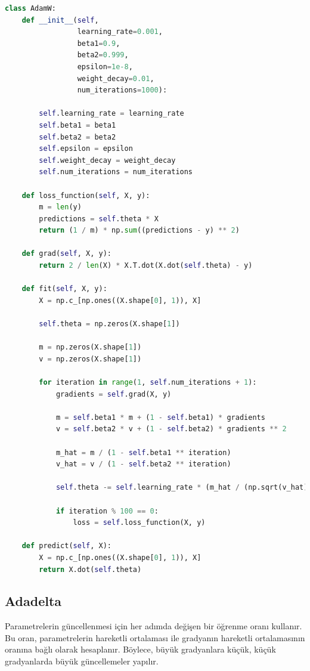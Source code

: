 \begin{lstlisting}[language=Python]
class AdamW:
    def __init__(self,
                 learning_rate=0.001,
                 beta1=0.9,
                 beta2=0.999,
                 epsilon=1e-8,
                 weight_decay=0.01,
                 num_iterations=1000):

        self.learning_rate = learning_rate
        self.beta1 = beta1
        self.beta2 = beta2
        self.epsilon = epsilon
        self.weight_decay = weight_decay
        self.num_iterations = num_iterations

    def loss_function(self, X, y):
        m = len(y)
        predictions = self.theta * X
        return (1 / m) * np.sum((predictions - y) ** 2)

    def grad(self, X, y):
        return 2 / len(X) * X.T.dot(X.dot(self.theta) - y)

    def fit(self, X, y):
        X = np.c_[np.ones((X.shape[0], 1)), X]

        self.theta = np.zeros(X.shape[1])

        m = np.zeros(X.shape[1])
        v = np.zeros(X.shape[1])

        for iteration in range(1, self.num_iterations + 1):
            gradients = self.grad(X, y)

            m = self.beta1 * m + (1 - self.beta1) * gradients
            v = self.beta2 * v + (1 - self.beta2) * gradients ** 2

            m_hat = m / (1 - self.beta1 ** iteration)
            v_hat = v / (1 - self.beta2 ** iteration)

            self.theta -= self.learning_rate * (m_hat / (np.sqrt(v_hat) + self.epsilon) + self.weight_decay * self.theta)

            if iteration % 100 == 0:
                loss = self.loss_function(X, y)

    def predict(self, X):
        X = np.c_[np.ones((X.shape[0], 1)), X]
        return X.dot(self.theta)
\end{lstlisting}

\newpage

\subsection{Adadelta}
Parametrelerin güncellenmesi için her adımda değişen bir öğrenme oranı kullanır. Bu oran, parametrelerin hareketli ortalaması ile gradyanın hareketli ortalamasının oranına bağlı olarak hesaplanır. Böylece, büyük gradyanlara küçük, küçük gradyanlarda büyük güncellemeler yapılır.

